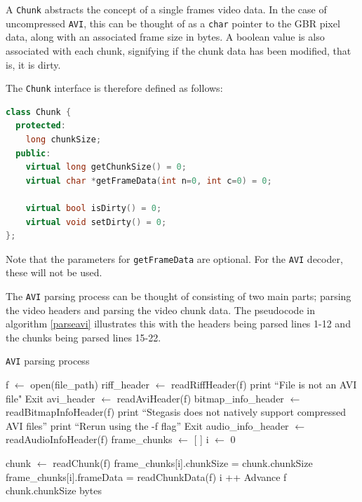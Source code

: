 \documentclass[paper=a4, fontsize=11pt,twoside]{scrartcl}
\numberwithin{table}{section}
\numberwithin{figure}{section}
\numberwithin{algorithm}{section}
\begin{document}
A \texttt{Chunk} abstracts the concept of a single frames video data. In the case of uncompressed \texttt{AVI}, this can be thought of as a \texttt{char} pointer to the GBR pixel data, along with an associated frame size in bytes. A boolean value is also associated with each chunk, signifying if the chunk data has been modified, that is, it is dirty.

The \texttt{Chunk} interface is therefore defined as follows:

\begin{lstlisting}[language=C++, caption={Chunk interface (\texttt{video/video\_decoder.h:4})}, frame=single]
class Chunk {
  protected:
    long chunkSize;
  public:
    virtual long getChunkSize() = 0;
    virtual char *getFrameData(int n=0, int c=0) = 0;
   
    virtual bool isDirty() = 0;
    virtual void setDirty() = 0;
};
\end{lstlisting}

\noindent
Note that the parameters for \texttt{getFrameData} are optional. For the \texttt{AVI} decoder, these will not be used.

The \texttt{AVI} parsing process can be thought of consisting of two main parts; parsing the video headers and parsing the video chunk data. The pseudocode in algorithm \ref{parseavi} illustrates this with the headers being parsed lines 1-12 and the chunks being parsed lines 15-22.

\begin{algorithm}[!h]
\caption{\texttt{AVI} parsing process}
\label{parseavi}
\begin{algorithmic}[1]
\State f $\gets$ open(file\_path)
\State riff\_header $\gets$ readRiffHeader(f)
	\State print ``File is not an AVI file"
	\State Exit
\EndIf
\State avi\_header $\gets$ readAviHeader(f)
\State bitmap\_info\_header $\gets$ readBitmapInfoHeader(f)
	\State print ``Stegasis does not natively support compressed AVI files''
	\State print ``Rerun using the -f flag''
	\State Exit
\EndIf
\State audio\_info\_header $\gets$ readAudioInfoHeader(f)
\State frame\_chunks $\gets$ [ ]
\State i $\gets$ 0

	\State chunk $\gets$ readChunk(f)
		\State frame\_chunks[i].chunkSize = chunk.chunkSize
		\State frame\_chunks[i].frameData = readChunkData(f)
		\State i ++
	\Else
		\State Advance f chunk.chunkSize bytes
	\EndIf
\EndWhile
\end{algorithmic}
\end{algorithm}
\end{document}
